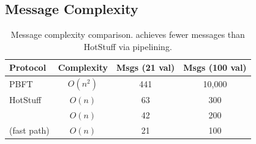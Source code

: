 \subsection{Message Complexity}

\begin{table}[t]
\centering
\begin{tabular}{lccc}
\toprule
\textbf{Protocol} & \textbf{Complexity} & \textbf{Msgs (21 val)} & \textbf{Msgs (100 val)} \\
\midrule
PBFT & $O(n^2)$ & 441 & 10,000 \\
HotStuff & $O(n)$ & 63 & 300 \\
\Quasar{} & $O(n)$ & 42 & 200 \\
\Quasar{} (fast path) & $O(n)$ & 21 & 100 \\
\bottomrule
\end{tabular}
\caption{Message complexity comparison. \Quasar{} achieves fewer messages than HotStuff via pipelining.}
\label{tab:messages}
\end{table}

